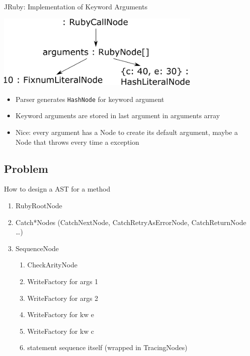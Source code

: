 \documentclass[xcolor=dvipsname,handout]{beamer} %
\begin{document}
\begin{frame}{JRuby: Implementation of Keyword Arguments}
\begin{table}
    \centering
    \includegraphics[width=0.75\textwidth]{kwarg_1.pdf}
\end{table}

\begin{itemize}
    \item Parser generates \lstinline{HashNode} for keyword argument
    \item Keyword arguments are stored in last argument in arguments array
    \item Nice: every argument has a Node to create its default argument, maybe a Node that throws every time a exception
\end{itemize}
\end{frame}

\subsection{Problem}
\begin{frame}{How to design a AST for a method}
\begin{enumerate}
 \item RubyRootNode
 \item Catch*Nodes (CatchNextNode, CatchRetryAsErrorNode, CatchReturnNode \dots)
 \item SequenceNode \begin{enumerate}
    \item CheckArityNode
    \item WriteFactory for args 1
    \item WriteFactory for args 2
    \item WriteFactory for kw e
    \item WriteFactory for kw c
    \item statement sequence itself (wrapped in TracingNodes)
  \end{enumerate}
\end{enumerate}

\end{frame}
\end{document}
